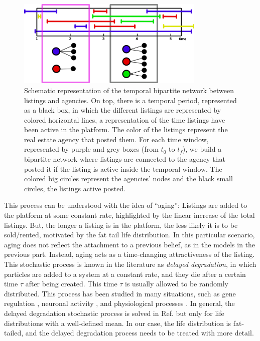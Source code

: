 \begin{figure}
    \vspace{0.2 cm}
    \centering
    \includegraphics[width = 0.8\textwidth]{Figs/Idealista_dynamics/temporal_bipartite.pdf}
	\caption[Housing market as a temporal bipartite network.]{Schematic representation of the temporal bipartite network between listings and agencies. On top, there is a temporal period, represented as a black box, in which the different listings are represented by colored horizontal lines, a representation of the time listings have been active in the platform. The color of the listings represent the real estate agency that posted them. For each time window, represented by purple and grey boxes (from $t_0$ to $t_f$), we build a bipartite network where listings are connected to the agency that posted it if the listing is active inside the temporal window. The colored big circles represent the agencies' nodes and the black small circles, the listings active posted. \label{fig:temporal_bipartite}}
\end{figure}

This process can be understood with the idea of ``aging'': Listings are added to the platform at some constant rate, highlighted by the linear increase of the total listings. But, the longer a listing is in the platform, the less likely it is to be sold/rented, motivated by the fat tail life distribution. In this particular scenario, aging does not reflect the attachment to a previous belief, as in the models in the previous part. Instead, aging acts as a time-changing attractiveness of the listing. This stochastic process is known in the literature as \textit{delayed degradation}, in which particles are added to a system at a constant rate, and they die after a certain time $\tau$ after being created. This time $\tau$ is usually allowed to be randomly distributed. This process has been studied in many situations, such as gene regulation \cite{}, neuronal activity \cite{}, and physiological processes \cite{}. In general, the delayed degradation stochastic process is solved in Ref. \cite{LaFuerza2013} but only for life distributions with a well-defined mean. In our case, the life distribution is fat-tailed, and the delayed degradation process needs to be treated with more detail.

